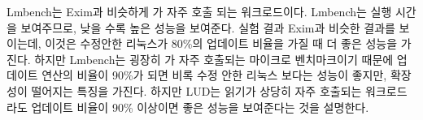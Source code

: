 Lmbench는 Exim과 비슷하게 가 자주 호출 되는 워크로드이다.
Lmbench는 실행 시간을 보여주므로, 낮을 수록 높은 성능을 보여준다. 
실험 결과 Exim과 비슷한 결과를 보이는데, 이것은 수정안한 리눅스가 80\%의 업데이트 
비율을 가질 때 더 좋은 성능을 가진다.
하지만 Lmbench는 굉장히 가 자주 호출되는 마이크로 벤치마크이기 때문에 업데이트 연산의 비율이 
90\%가 되면 비록 수정 안한 리눅스 보다는 성능이 좋지만, 확장성이 떨어지는 특징을 가진다.
하지만 LUD는 읽기가 상당히 자주 호출되는 워크로드라도 업데이트 비율이 90\% 이상이면 
좋은 성능을 보여준다는 것을 설명한다. 
 
